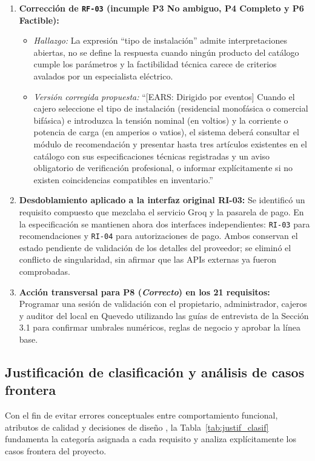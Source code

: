 \documentclass[onecolumn,12pt,a4paper]{IEEEtran}
\begin{document}
	\begin{enumerate}
		\item \textbf{Correcci\'on de \texttt{RF-03} (incumple P3 No ambiguo, P4 Completo y P6 Factible):}
		\begin{itemize}
			\item \textit{Hallazgo:} La expresi\'on ``tipo de instalaci\'on'' admite interpretaciones abiertas, no se define la respuesta cuando ning\'un producto del cat\'alogo cumple los par\'ametros y la factibilidad t\'ecnica carece de criterios avalados por un especialista el\'ectrico.
			\item \textit{Versi\'on corregida propuesta:} ``[EARS: Dirigido por eventos] Cuando el cajero seleccione el tipo de instalaci\'on (residencial monof\'asica o comercial bif\'asica) e introduzca la tensi\'on nominal (en voltios) y la corriente o potencia de carga (en amperios o vatios), el sistema deber\'a consultar el m\'odulo de recomendaci\'on y presentar hasta tres art\'iculos existentes en el cat\'alogo con sus especificaciones t\'ecnicas registradas y un aviso obligatorio de verificaci\'on profesional, o informar expl\'icitamente si no existen coincidencias compatibles en inventario.''
		\end{itemize}
		\item \textbf{Desdoblamiento aplicado a la interfaz original RI-03:} Se identific\'o un requisito compuesto que mezclaba el servicio Groq y la pasarela de pago. En la especificaci\'on se mantienen ahora dos interfaces independientes: \texttt{RI-03} para recomendaciones y \texttt{RI-04} para autorizaciones de pago. Ambos conservan el estado pendiente de validaci\'on de los detalles del proveedor; se elimin\'o el conflicto de singularidad, sin afirmar que las APIs externas ya fueron comprobadas.
        \item \textbf{Acci\'on transversal para P8 (\textit{Correcto}) en los 21 requisitos:} Programar una sesi\'on de validaci\'on con el propietario, administrador, cajeros y auditor del local en Quevedo utilizando las gu\'ias de entrevista de la Secci\'on 3.1 para confirmar umbrales num\'ericos, reglas de negocio y aprobar la l\'inea base.
	\end{enumerate}

	\subsection{Justificaci\'on de clasificaci\'on y an\'alisis de casos frontera}

	Con el fin de evitar errores conceptuales entre comportamiento funcional, atributos de calidad y decisiones de dise\~no \cite{pohl2025,glinz2007}, la Tabla~\ref{tab:justif_clasif} fundamenta la categor\'ia asignada a cada requisito y analiza expl\'icitamente los casos frontera del proyecto.
\end{document}
